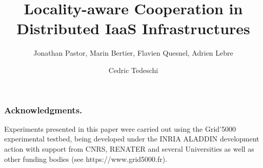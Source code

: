 \documentclass[runningheads,a4paper]{llncs2e/llncs}
\begin{document}
\title{Locality-aware Cooperation in Distributed IaaS Infrastructures}

%
%
\author{Jonathan Pastor, Marin Bertier, Flavien Quesnel,
Adrien Lebre \and Cedric Tedeschi}
%


\maketitle



\listoftodos
 












%
%
%
%
%
%
%

%
%

%

\subsubsection{Acknowledgments.}
Experiments presented in this paper were carried out using the Grid'5000
experimental testbed, being developed under the INRIA ALADDIN development
 action with support from CNRS, RENATER and several Universities as well as
  other funding bodies (see https://www.grid5000.fr).



\end{document}
